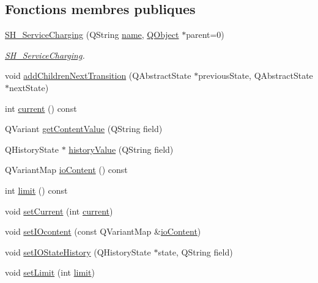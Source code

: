 \subsection*{Fonctions membres publiques}
\begin{DoxyCompactItemize}
\item 
\hyperlink{classSH__ServiceCharging_afa5273d046049b1c2b020a6a19a8290b}{S\-H\-\_\-\-Service\-Charging} (Q\-String \hyperlink{classSH__NamedObject_a970f265df31b28b2179bbbceb6170ac2}{name}, \hyperlink{classQObject}{Q\-Object} $\ast$parent=0)
\begin{DoxyCompactList}\small\item\em \hyperlink{classSH__ServiceCharging}{S\-H\-\_\-\-Service\-Charging}. \end{DoxyCompactList}\item 
void \hyperlink{classSh__LoopingInOutStateMachine_acfd8d0711c793b13c759f6c50be6a315}{add\-Children\-Next\-Transition} (Q\-Abstract\-State $\ast$previous\-State, Q\-Abstract\-State $\ast$next\-State)
\item 
int \hyperlink{classSh__LoopingInOutStateMachine_a1b4661f92617e9cdbacc1be354f2a54a}{current} () const 
\item 
Q\-Variant \hyperlink{classSH__InOutStateMachine_a2cdd914f1e597ac52d021106eec75c89}{get\-Content\-Value} (Q\-String field)
\item 
Q\-History\-State $\ast$ \hyperlink{classSH__InOutStateMachine_a84fb2b2c2105cae9c590c0d15960854a}{history\-Value} (Q\-String field)
\item 
Q\-Variant\-Map \hyperlink{classSH__InOutStateMachine_a79b456cb2e353cb61ef9fe19c97fc8fb}{io\-Content} () const 
\item 
int \hyperlink{classSh__LoopingInOutStateMachine_ac44b7158256f09b878c8958cf3ae3bf8}{limit} () const 
\item 
void \hyperlink{classSh__LoopingInOutStateMachine_ac94dde3e948b7b86a575e421cce2b9ba}{set\-Current} (int \hyperlink{classSh__LoopingInOutStateMachine_a1b4661f92617e9cdbacc1be354f2a54a}{current})
\item 
void \hyperlink{classSH__InOutStateMachine_a23a925522339132a51d16a7cff9074b9}{set\-I\-Ocontent} (const Q\-Variant\-Map \&\hyperlink{classSH__InOutStateMachine_a79b456cb2e353cb61ef9fe19c97fc8fb}{io\-Content})
\item 
void \hyperlink{classSH__InOutStateMachine_a4b72e6da839782a211692a4d728c3925}{set\-I\-O\-State\-History} (Q\-History\-State $\ast$state, Q\-String field)
\item 
void \hyperlink{classSh__LoopingInOutStateMachine_ab5e9ac94cbd9a47a45dcb50e777c398b}{set\-Limit} (int \hyperlink{classSh__LoopingInOutStateMachine_aea47cac4b5f895ba85604cdce1160ccd}{limit})

\end{DoxyCompactItemize}
